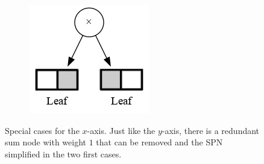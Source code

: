 \documentclass{amsart}
\theoremstyle{plain}
\numberwithin{equation}{section}
\begin{document}
\begin{figure}[h]
\begin{subfigure}[b]{0.3\linewidth}
  \end{subfigure}
  \begin{subfigure}[b]{0.3\linewidth}
    \centering\includegraphics[scale=0.3]{graphs/cc6.png}
    \caption{\label{fig:basex-2}}
  \end{subfigure}
  \captionsetup{justification=raggedright}
  \caption{Special cases for the $x$-axis. Just like the $y$-axis, there is a redundant sum node
  with weight $1$ that can be removed and the SPN simplified in the two first cases.}
\end{figure}
\end{document}
